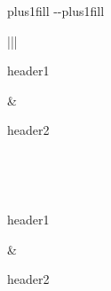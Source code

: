 \label{\detokenize{longtable:longtable-having-verbatim}}

\begin{savenotes}
\sphinxatlongtablestart
\sphinxthistablewithglobalstyle
\makeatletter
  \LTleft \@totalleftmargin plus1fill
  \LTright\dimexpr\columnwidth-\@totalleftmargin-\linewidth\relax plus1fill
\makeatother
\begin{longtable}{|*{2}{|}}
\sphinxtoprule
\begin{varwidth}[t]{}
\sphinxstyletheadfamily \sphinxAtStartPar
header1
\sphinxbeforeendvarwidth
\end{varwidth}%
&\begin{varwidth}[t]{}
\sphinxstyletheadfamily \sphinxAtStartPar
header2
\sphinxbeforeendvarwidth
\end{varwidth}%
\\
\sphinxmidrule
\endfirsthead

\\
\sphinxtoprule
\begin{varwidth}[t]{}
\sphinxstyletheadfamily \sphinxAtStartPar
header1
\sphinxbeforeendvarwidth
\end{varwidth}%
&\begin{varwidth}[t]{}
\sphinxstyletheadfamily \sphinxAtStartPar
header2
\sphinxbeforeendvarwidth
\end{varwidth}%
\\
\sphinxmidrule
\endhead

\sphinxbottomrule
{}\\
\endfoot

\endlastfoot
\sphinxtableatstartofbodyhook
\begin{varwidth}[t]{}


\end{varwidth}
\end{longtable}
\end{savenotes}
